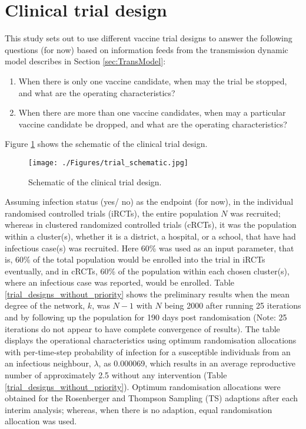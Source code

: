\documentclass[a4paper]{article}
\begin{document}
	\section{Clinical trial design}
	\label{sec:TrialDesign}
	This study sets out to use different vaccine trial designs to answer the following questions (for now) based on information feeds from the transmission dynamic model describes in Section \ref{sec:TransModel}:
	\begin{enumerate}
		\item When there is only one vaccine candidate, when may the trial be stopped, and what are the operating characteristics?
		\item When there are more than one vaccine candidates, when may a particular vaccine candidate be dropped, and what are the operating characteristics?
	\end{enumerate}
	
	Figure \ref{fig:trial} shows the schematic of the clinical trial design. 
	\begin{figure}[!ht]
		\begin{center}	
			\texttt{[image: ./Figures/trial\_schematic.jpg]} 
		\end{center}
		\caption[Schematic of the clinical trial design]{Schematic of the clinical trial design.}
		\label{fig:trial}
	\end{figure}
	
	Assuming infection status (yes/ no) as the endpoint (for now), in the individual randomised controlled trials (iRCTs), the entire population $N$ was recruited; whereas in clustered randomized controlled trials (cRCTs), it was the population within a cluster(s), whether it is a district, a hospital, or a school, that have had infectious case(s) was recruited. Here 60\% was used as an input parameter, that is, 60\% of the total population would be enrolled into the trial in iRCTs eventually, and in cRCTs, 60\% of the population within each chosen cluster(s), where an infectious case was reported, would be enrolled. Table \ref{trial_designs_without_priority} shows the preliminary results when the mean degree of the network, $k$, was $N-1$ with $N$ being 2000 after running 25 iterations and by following up the population for 190 days post randomisation (Note: 25 iterations do not appear to have complete convergence of results). The table displays the operational characteristics using optimum randomisation allocations with per-time-step probability of infection for a susceptible individuals from an an infectious neighbour, $\lambda$, as 0.000069, which results in an average reproductive number of approximately 2.5 without any intervention (Table \ref{trial_designs_without_priority}). Optimum randomisation allocations were obtained for the Rosenberger and Thompson Sampling (TS) adaptions after each interim analysis; whereas, when there is no adaption, equal randomisation allocation was used.  
	
\end{document}
